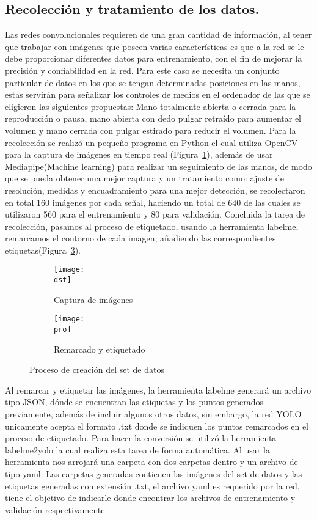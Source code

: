 \documentclass[a4paper, 12pt]{article}
\newcommand{\dst}{img/create_dst.png}
\newcommand{\pro}{img/label_procss.png}
\begin{document}
	\subsection{Recolección y tratamiento de los datos.}
	Las redes convolucionales requieren de una gran cantidad de información, al tener que trabajar con imágenes que poseen varias características es que a la red se le debe proporcionar diferentes datos para entrenamiento, con el fin de mejorar la precisión y confiabilidad en la red. Para este caso se necesita un conjunto particular de datos en los que se tengan determinadas posiciones en las manos, estas servirán para señalizar los controles de medios en el ordenador de las que se eligieron las siguientes propuestas: Mano totalmente abierta o cerrada para la reproducción o pausa, mano abierta con dedo pulgar retraído para aumentar el volumen y mano cerrada con pulgar estirado para reducir el volumen. Para la recolección se realizó un pequeño programa en Python el cual utiliza OpenCV para la captura de imágenes en tiempo real (Figura~\ref{sub:create_dataset}), además de usar Mediapipe(Machine learning) para realizar un seguimiento de las manos, de modo que se pueda obtener una mejor captura y un tratamiento como: ajuste de resolución, medidas y encuadramiento para una mejor detección, se recolectaron en total 160 imágenes por cada señal, haciendo un total de 640 de las cuales se utilizaron 560 para el entrenamiento y 80 para validación. Concluida la tarea de recolección, pasamos al proceso de etiquetado, usando la herramienta labelme, remarcamos el contorno de cada imagen, añadiendo las correspondientes etiquetas(Figura~\ref{sub:label_prcss}).

	\begin{figure}[H]
        \centering
		\begin{subfigure}{0.5\linewidth}
			\texttt{[image: \\dst]}
			\caption{Captura de imágenes}
			\label{sub:create_dataset}
		\end{subfigure}

        \begin{subfigure}{0.5\textwidth}
            \texttt{[image: \\pro]}
            \caption{Remarcado y etiquetado}
            \label{sub:label_prcss}
        \end{subfigure}
    \caption{Proceso de creación del set de datos}
	\end{figure}

	Al remarcar y etiquetar las imágenes, la herramienta labelme generará un archivo tipo JSON, dónde se encuentran las etiquetas y los puntos generados previamente, además de incluir algunos otros datos, sin embargo, la red YOLO unicamente acepta el formato .txt donde se indiquen los puntos remarcados en el proceso de etiquetado. Para hacer la conversión se utilizó la herramienta labelme2yolo la cual realiza esta tarea de forma automática. Al usar la herramienta nos arrojará una carpeta con dos carpetas dentro y un archivo de tipo yaml. Las carpetas generadas contienen las imágenes del set de datos y las etiquetas generadas con extensión .txt, el archivo yaml es requerido por la red, tiene el objetivo de indicarle donde encontrar los archivos de entrenamiento y validación respectivamente.
\end{document}

